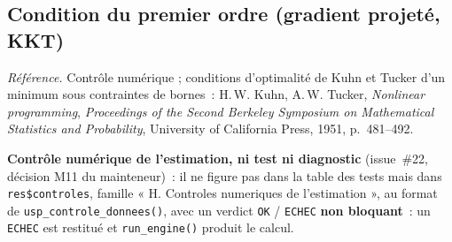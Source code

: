 \documentclass[a4paper,11pt]{article}
\newcommand{\code}[1]{\texttt{\small #1}}
\newcommand{\refl}[1]{{\small\textcolor{maincolor!70!black}{\textit{Référence.} #1}}\par\smallskip}
\newcounter{ficheid}
\newenvironment{fiche}[1]{%
  \stepcounter{ficheid}%
  \phantomsection
  \subsection{#1}%
  \label{fiche:\theficheid}%
}{%
  \end{description}\vspace{0.5em}%
}
\newcommand{\Cadre}{%
  \begin{description}[leftmargin=0pt, style=unboxed, itemsep=3pt, topsep=3pt, parsep=2pt]%
  \item[\textcolor{financeblue}{\textbf{1. Cadre, notations et hypothèses de validité (non testées).}}]}
\begin{document}
\begin{fiche}{Condition du premier ordre (gradient projeté, KKT)}
\label{fiche:foc}%
\refl{Contrôle numérique ; conditions d'optimalité de Kuhn et Tucker d'un minimum sous contraintes
de bornes~: H.\,W. Kuhn, A.\,W. Tucker, \emph{Nonlinear programming}, \emph{Proceedings of the
Second Berkeley Symposium on Mathematical Statistics and Probability}, University of California
Press, 1951, p.~481--492.}
\Cadre
\textbf{Contrôle numérique de l'estimation, ni test ni diagnostic} (issue~\#22, décision M11 du
mainteneur)~: il ne figure pas dans la table des tests mais dans \code{res\$controles}, famille
« H. Controles numeriques de l'estimation », au format de \code{usp\_controle\_donnees()}, avec un
verdict \code{OK} / \code{ECHEC} \textbf{non bloquant}~: un \code{ECHEC} est restitué et
\code{run\_engine()} produit le calcul.


\end{fiche}
\end{document}
